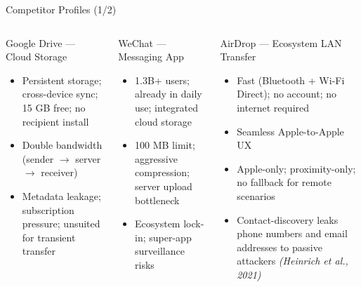 \documentclass[xcolor=table,dvipsnames,svgnames,aspectratio=169]{beamer}
\begin{document}
\begin{frame}[shrink=12]{Competitor Profiles (1/2)}
  \begin{columns}[t]
    \begin{block}{Google Drive --- Cloud Storage}
      \small\begin{itemize}
        \item[\faPlus] Persistent storage; cross-device sync; 15 GB free; no recipient install
        \item[\faMinus] Double bandwidth (sender $\to$ server $\to$ receiver)
        \item[\faMinus] Metadata leakage; subscription pressure; unsuited for transient transfer
      \end{itemize}
    \end{block}
    \vspace{0.3em}
    \begin{block}{WeChat --- Messaging App}
      \small\begin{itemize}
        \item[\faPlus] 1.3B+ users; already in daily use; integrated cloud storage
        \item[\faMinus] 100 MB limit; aggressive compression; server upload bottleneck
        \item[\faMinus] Ecosystem lock-in; super-app surveillance risks
      \end{itemize}
    \end{block}
    \begin{block}{AirDrop --- Ecosystem LAN Transfer}
      \small\begin{itemize}
        \item[\faPlus] Fast (Bluetooth + Wi-Fi Direct); no account; no internet required
        \item[\faPlus] Seamless Apple-to-Apple UX
        \item[\faMinus] Apple-only; proximity-only; no fallback for remote scenarios
        \item[\faMinus] Contact-discovery leaks phone numbers and email addresses to passive attackers \textit{(Heinrich et al., 2021)}
      \end{itemize}
    \end{block}
  \end{columns}
\end{frame}
\end{document}
